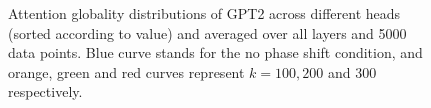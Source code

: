 \documentclass[letterpaper, 12pt]{report}
\begin{document}
\begin{figure}
    \centering
    \caption{Attention globality distributions of GPT2 across different heads (sorted according to value) and averaged over all layers and 5000 data points. Blue curve stands for the no phase shift condition, and orange, green and red curves represent $k=100,200$ and $300$ respectively.}
    \label{fig:globality_GPT2}
\end{figure}
\end{document}
